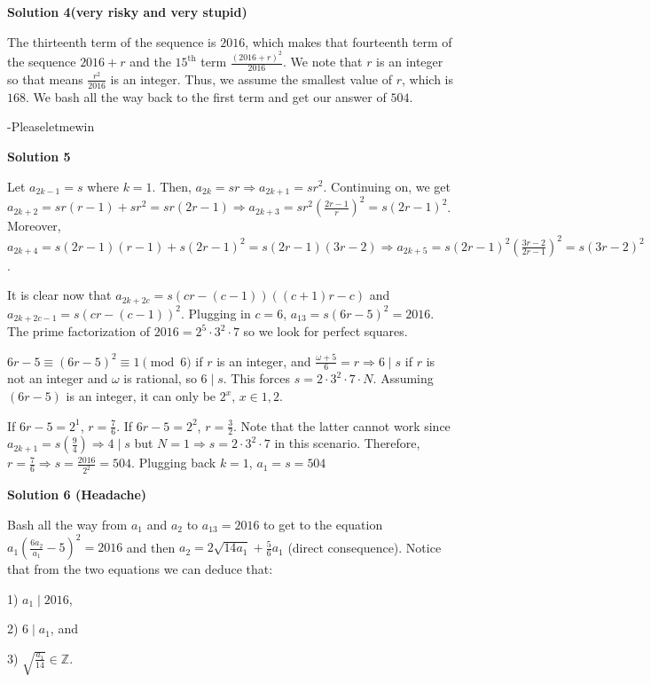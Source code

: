 \begin{enumerate}
\textbf{Solution 4(very risky and very stupid)}

The thirteenth term of the sequence is $2016$, which makes that fourteenth term of the sequence $2016+r$ and the $15^{\text{th}}$ term $\frac{(2016+r)^2}{2016}$. We note that $r$ is an integer so that means $\frac{r^2}{2016}$ is an integer. Thus, we assume the smallest value of $r$, which is $168$. We bash all the way back to the first term and get our answer of $\boxed{504}$.

 -Pleaseletmewin

 



\textbf{Solution 5}

Let $a_{2k-1}=s$ where $k=1$. Then, $a_{2k}=sr \Longrightarrow a_{2k+1}=sr^2$. Continuing on, we get $a_{2k+2}=sr(r-1)+sr^2=sr(2r-1) \Longrightarrow a_{2k+3}=sr^2(\frac{2r-1}{r})^2=s(2r-1)^2$. Moreover, $a_{2k+4}=s(2r-1)(r-1)+s(2r-1)^2=s(2r-1)(3r-2) \Longrightarrow a_{2k+5}=s(2r-1)^2(\frac{3r-2}{2r-1})^2=s(3r-2)^2$.

 It is clear now that $a_{2k+2c}=s(cr-(c-1))((c+1)r-c)$ and $a_{2k+2c-1}=s(cr-(c-1))^2$. Plugging in $c=6$, $a_{13}=s(6r-5)^2=2016$. The prime factorization of $2016=2^5\cdot3^2\cdot7$ so we look for perfect squares.

 $6r-5\equiv (6r-5)^2\equiv 1\pmod{6}$ if $r$ is an integer, and $\frac{\omega+5}{6}=r \Longrightarrow 6\mid{s}$ if $r$ is not an integer and $\omega$ is rational, so $6\mid{s}$. This forces $s=2\cdot3^2\cdot7\cdot{N}$. Assuming $(6r-5)$ is an integer, it can only be $2^x$, $x\in{1,2}$.

 If $6r-5=2^1$, $r=\frac{7}{6}$. If $6r-5=2^2$, $r=\frac{3}{2}$. Note that the latter cannot work since $a_{2k+1}=s(\frac{9}{4}) \Longrightarrow 4\mid{s}$ but $N=1 \Longrightarrow s=2\cdot3^2\cdot7$ in this scenario. Therefore, $r=\frac{7}{6} \Longrightarrow s=\frac{2016}{2^2}=504$. Plugging back $k=1$, $a_1=s=\boxed{504}$




\textbf{Solution 6 (Headache)}

Bash all the way from $a_1$ and $a_2$ to $a_{13}=2016$ to get to the equation $a_1\left(\frac{6a_2}{a_1}-5\right)^2=2016$ and then $a_2=2\sqrt{14a_1}+\frac{5}{6}a_1$ (direct consequence). Notice that from the two equations we can deduce that:

 1) $a_1\mid2016$,

 2) $6\mid a_1$, and

 3) $\sqrt{\frac{a_1}{14}}\in\mathbb{Z}$.


\end{enumerate}

